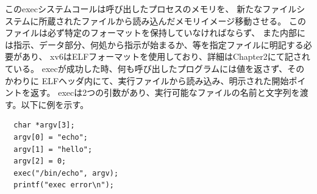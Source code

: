 \documentclass[11pt,a4paper, uplatex]{jsarticle}
\begin{document}
このexecシステムコールは呼び出したプロセスのメモリを、
新たなファイルシステムに所蔵されたファイルから読み込んだメモリイメージ移動させる。
このファイルは必ず特定のフォーマットを保持していなければならず、
また内部には指示、データ部分、何処から指示が始まるか、等を指定ファイルに明記する必要があり、
xv6はELFフォーマットを使用しており、詳細はChapter2にて記されている。
execが成功した時、何も呼び出したプログラムには値を返さず、そのかわりに
ELFヘッダ内にて、実行ファイルから読み込み、明示された開始ポイントを返す。
execは2つの引数があり、実行可能なファイルの名前と文字列を渡す。以下に例を示す。
\begin{lstlisting}
  char *argv[3];
  argv[0] = "echo";
  argv[1] = "hello";
  argv[2] = 0;
  exec("/bin/echo", argv);
  printf("exec error\n");
\end{lstlisting}
%
%
\end{document}
